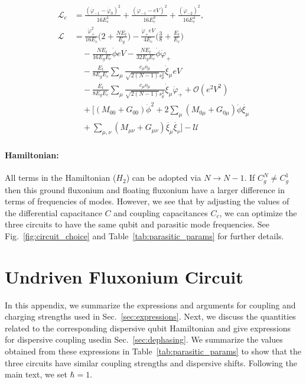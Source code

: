 \documentclass[%
reprint,
superscriptaddress,
 amsmath,amssymb,
 aps,
 prx,
longbibliography,
floatfix,
]{revtex4-2}
\newcommand{\ER}[1]{{\color{blue}{{}[ER: #1]}}}
\begin{document}
\begin{align}
    \mathcal{L}_{c}&=\frac{(\dot{\varphi}_{-1}-\dot{\varphi}_{0})^2}{16E^1_{c}}+\frac{(\dot{\varphi}_{-1}-eV)^2}{16E^3_{c}}+\frac{(\dot{\varphi}_{-2})^2}{16E^4_{c}},\\
 \mathcal{L}&=\frac{\dot{\varphi}_{+}^2}{16E_c}\Big(2+\frac{NE_t}{E_g}\Big)-\frac{\dot{\varphi}_{+}eV}{4E_c}\Big(\frac{3}{8}+\frac{E_t}{E_c}\Big)\nonumber\\
    &\quad-\frac{NE_t}{16E_gE_c}\dot{\phi}eV-\frac{NE_t}{32E_gE_c}\dot{\phi}\dot{\varphi}_{+}\\
    &\quad -\frac{E_t}{8E_gE_c} \sum_\mu\frac{c_\mu o_\mu}{\sqrt{2(N-1)}s_\mu^2}  \dot{\xi}_\mu eV\nonumber\\
    &\quad-\frac{E_t}{8E_gE_c} \sum_\mu\frac{c_\mu o_\mu}{\sqrt{2(N-1)}s_\mu^2}  \dot{\xi}_\mu\dot{\varphi}_{+}+\mathcal{O}(e^2V^2)\\
    &\quad+\Big[(M_{00}+G_{00})\dot{\phi}^2+2\sum_{\mu}(M_{0\mu}+G_{0\mu})\dot{\phi}\dot{\xi_\mu}\nonumber\\
    &\quad+\sum_{\mu,\nu}(M_{\mu\nu}+G_{\mu\nu})\dot{\xi_\mu}\dot{\xi_\nu}\Big]-\mathcal{U}
\end{align}

\paragraph{Hamiltonian:} All terms in the Hamiltonian ($H_2$) can be adopted \ER{what do you mean by adopted?} via $N\rightarrow N-1$. If $C_g^N\neq C_g^1$ then this ground fluxonium and floating fluxonium have a larger difference in terms of frequencies of modes. However, we see that by adjusting the values of the differential capacitance $C$ and coupling capacitances $C_c$, we can optimize the three circuits to have the same qubit and parasitic mode frequencies. See Fig.~\ref{fig:circuit_choice} and Table~\ref{tab:parasitic_params} for further details.


\section{Undriven Fluxonium Circuit}\label{app:Hamiltonian}
In this appendix, we summarize the expressions and arguments for coupling and charging strengths used in Sec.~\ref{sec:expressions}. Next, we discuss the quantities related to the corresponding dispersive qubit Hamiltonian and give expressions for dispersive coupling usedin Sec.~\ref{sec:dephasing}. We summarize the values obtained from these expressions in Table~\ref{tab:parasitic_params} to show that the three circuits have similar coupling strengths and dispersive shifts. Following the main text, we set $\hbar=1$. 
\end{document}
